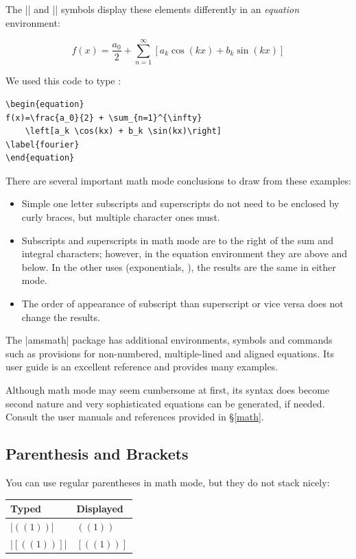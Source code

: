 The |\sum| and |\int| symbols display these elements differently in an \emph{equation} environment:

\begin{equation}
f(x)=\frac{a_0}{2} + \sum_{n=1}^{\infty}\left[a_k \cos(kx) + b_k \sin(kx)\right]
\label{fourier}
\end{equation}

We used this code to type :
\begin{Verbatim}
\begin{equation}
f(x)=\frac{a_0}{2} + \sum_{n=1}^{\infty}
    \left[a_k \cos(kx) + b_k \sin(kx)\right]
\label{fourier}
\end{equation}
\end{Verbatim}

There are several important math mode conclusions to draw from these examples:
\begin{itemize}
  \item Simple one letter subscripts and superscripts do not need to be enclosed by curly braces, but multiple character ones must.
  \item Subscripts and superscripts in math mode are to the right of
    the sum and integral characters; however, in the equation
    environment they are above and below.  In the other uses
    (exponentials, \etc), the results are the same in either mode.
  \item The order of appearance of subscript than superscript or vice versa does not change the results.
\end{itemize}


The |amsmath| package has additional environments, symbols and commands such as
provisions for non-numbered, multiple-lined and aligned equations. Its user
guide is an excellent reference and provides many examples.

Although math mode may seem cumbersome at first, its syntax does become second
nature and very sophisticated equations can be generated, if needed.  Consult
the user manuals and references provided in \S\ref{math}.

\subsection{Parenthesis and Brackets}
You can use regular parentheses in math mode, but they do not stack nicely:

\begin{center}
\begin{tabular}{l|l}
Typed                   & Displayed\\\hline
|$((1))$| & $((1))$\\
|$[((1))]$| & $[((1))]$
\end{tabular}
\end{center}


